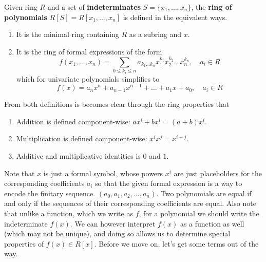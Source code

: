   \begin{definition}
    Given ring $R$ and a set of \textbf{indeterminates} $S = \{x_1, \ldots, x_n\}$, the \textbf{ring of polynomials} $R[S] = R[x_1, \ldots, x_n]$ is defined in the equivalent ways. 
    \begin{enumerate}
      \item It is the minimal ring containing $R$ as a subring and $x$. 
      \item It is the ring of formal expressions of the form 
      \begin{equation}
        f(x_1, \ldots, x_n) = \sum_{0 \leq k_i \leq n} a_{k_1 \ldots k_n} x_1^{k_1} x_2^{k_2} \ldots x_n^{k_n}, \quad a_i \in R
      \end{equation}
      which for univariate polynomials simplifies to 
      \begin{equation}
        f(x) = a_nx^n + a_{n-1}x^{n-1} + \dots + a_1 x + a_0, \quad a_i \in R
      \end{equation}
    \end{enumerate}
    From both definitions is becomes clear through the ring properties that 
    \begin{enumerate}
      \item Addition is defined component-wise: $a x^i + b x^i = (a + b) x^i$. 
      \item Multiplication is defined component-wise: $x^i x^j = x^{i + j}$. 
      \item Additive and multiplicative identities is $0$ and $1$. 
    \end{enumerate}
  \end{definition}

  Note that $x$ is just a formal symbol, whose powers $x^i$ are just placeholders for the corresponding coefficients $a_i$ so that the given formal expression is a way to encode the finitary sequence. $(a_0, a_1, a_2, ..., a_n)$. Two polynomials are equal if and only if the sequences of their corresponding coefficients are equal. Also note that unlike a function, which we write as $f$, for a polynomial we should write the indeterminate $f(x)$. We can however interpret $f(x)$ as a function as well (which may not be unique), and doing so allows us to determine special properties of $f(x) \in R[x]$. Before we move on, let's get some terms out of the way. 

